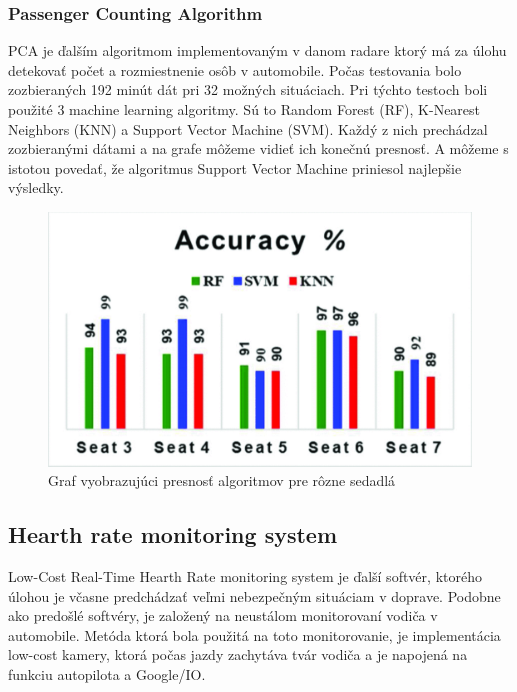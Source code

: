 \documentclass[10pt,oneside,slovak,a4paper]{article}
\begin{document}
\subsubsection{Passenger Counting Algorithm} \label{predstavenie:radar:pca}

PCA\cite{monitoring} je ďalším algoritmom implementovaným v danom radare ktorý má za úlohu detekovať počet a rozmiestnenie osôb v automobile. Počas testovania bolo zozbieraných 192 minút dát pri 32 možných situáciach. Pri týchto testoch boli použité 3 machine learning algoritmy. Sú to Random Forest (RF), K-Nearest Neighbors (KNN) a Support Vector Machine (SVM). Každý z nich prechádzal zozbieranými dátami a na grafe môžeme vidieť ich konečnú presnosť. A môžeme s istotou povedať, že algoritmus Support Vector Machine priniesol najlepšie výsledky.

\begin {figure} [H]
\includegraphics[scale=0.3]{accuracy} 
\centering
\caption{Graf vyobrazujúci presnosť algoritmov pre rôzne sedadlá\cite{monitoring}}
\label{fig1}
\end {figure}

\subsection{Hearth rate monitoring system} \label{predstavenie:hearth}
Low-Cost Real-Time Hearth Rate monitoring system je ďalší softvér, ktorého úlohou je včasne predchádzať veľmi nebezpečným situáciam v doprave. Podobne ako predošlé softvéry, je založený na neustálom monitorovaní vodiča v automobile. Metóda ktorá bola použitá na toto monitorovanie, je implementácia low-cost kamery, ktorá počas jazdy zachytáva tvár vodiča a je napojená na funkciu autopilota a Google/IO.\cite{hearth} 
\end{document}
